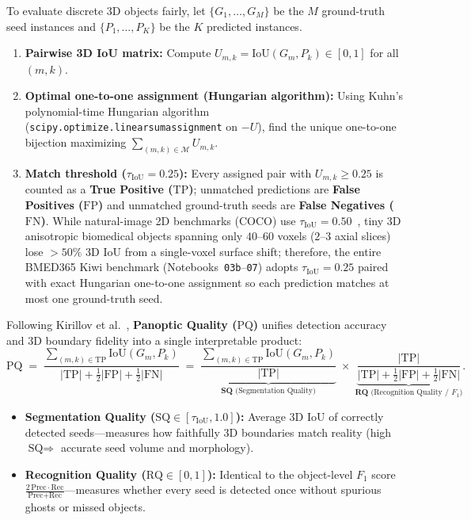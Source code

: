 \documentclass[10pt,a4paper]{article}
\renewcommand{\_}{\origunderscore\allowbreak}
\begin{document}
To evaluate discrete 3D objects fairly, let $\{G_1, \dots, G_M\}$ be the $M$ ground-truth seed instances and $\{P_1, \dots, P_K\}$ be the $K$ predicted instances.
\begin{enumerate}
    \item \textbf{Pairwise 3D IoU matrix:} Compute $U_{m,k} = \text{IoU}(G_m, P_k) \in [0, 1]$ for all $(m, k)$.
    \item \textbf{Optimal one-to-one assignment (Hungarian algorithm):} Using Kuhn's polynomial-time Hungarian algorithm~\cite{kuhn1955hungarian} (\texttt{scipy.optimize.linear\_sum\_assignment} on $-U$), find the unique one-to-one bijection maximizing $\sum_{(m,k)\in\mathcal{M}} U_{m,k}$.
    \item \textbf{Match threshold ($\tau_{\text{IoU}} = 0.25$):} Every assigned pair with $U_{m,k} \ge 0.25$ is counted as a \textbf{True Positive ($\text{TP}$)}; unmatched predictions are \textbf{False Positives ($\text{FP}$)} and unmatched ground-truth seeds are \textbf{False Negatives ($\text{FN}$)}. While natural-image 2D benchmarks (COCO) use $\tau_{\text{IoU}} = 0.50$~\cite{kirillov2019panoptic}, tiny 3D anisotropic biomedical objects spanning only $40\text{--}60$ voxels ($2\text{--}3$ axial slices) lose $>50\%$ 3D IoU from a single-voxel surface shift; therefore, the entire BMED365 Kiwi benchmark (Notebooks~\texttt{03b}--\texttt{07}) adopts $\tau_{\text{IoU}} = 0.25$ paired with exact Hungarian one-to-one assignment so each prediction matches at most one ground-truth seed.
\end{enumerate}

Following Kirillov et al.~\cite{kirillov2019panoptic}, \textbf{Panoptic Quality ($\text{PQ}$)} unifies detection accuracy and 3D boundary fidelity into a single interpretable product:
\begin{equation}
    \text{PQ} \;=\; \frac{\sum_{(m,k) \in \text{TP}} \text{IoU}(G_m, P_k)}{|\text{TP}| + \frac{1}{2}|\text{FP}| + \frac{1}{2}|\text{FN}|}
    \;=\;
    \underbrace{\frac{\sum_{(m,k) \in \text{TP}} \text{IoU}(G_m, P_k)}{|\text{TP}|}}_{\textbf{SQ} \text{ (Segmentation Quality)}}
    \;\times\;
    \underbrace{\frac{|\text{TP}|}{|\text{TP}| + \frac{1}{2}|\text{FP}| + \frac{1}{2}|\text{FN}|}}_{\textbf{RQ} \text{ (Recognition Quality / } F_1\text{)}}.
    \label{eq:pq_app}
\end{equation}
\begin{itemize}
    \item \textbf{Segmentation Quality ($\text{SQ} \in [\tau_{\text{IoU}}, 1.0]$):} Average 3D IoU of correctly detected seeds---measures how faithfully 3D boundaries match reality (high $\text{SQ} \Rightarrow$ accurate seed volume and morphology).
    \item \textbf{Recognition Quality ($\text{RQ} \in [0, 1]$):} Identical to the object-level $F_1$ score $\frac{2\,\text{Prec}\cdot\text{Rec}}{\text{Prec}+\text{Rec}}$---measures whether every seed is detected once without spurious ghosts or missed objects.
\end{itemize}
\end{document}

